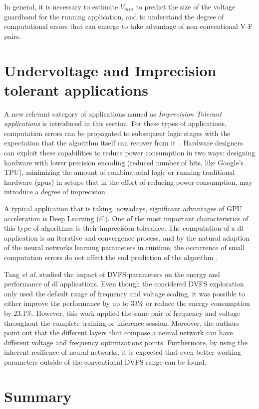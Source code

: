 In general, it is necessary to estimate $V_{min}$ to predict the size of the voltage guardband for the running application, and to understand the degree of computational errors that can emerge to take advantage of non-conventional V-F pairs.

\section{Undervoltage and Imprecision tolerant applications}
\label{sec:under_int_app}
A new relevant category of applications named as \textit{Imprecision Tolerant applications} is introduced in this section. For these types of applications, computation errors can be propagated to subsequent logic stages with the expectation that the algorithm itself can recover from it~\cite{nakhaee_lifetime_2018}. Hardware designers can exploit these capabilities to reduce power consumption in two ways: designing hardware with lower precision encoding (reduced number of bits, like Google's TPU), minimizing the amount of combinatorial logic or running traditional hardware (\acrshort{gpu}s) in setups that in the effort of reducing power consumption, may introduce a degree of imprecision.

A typical application that is taking, nowadays, significant advantages of GPU acceleration is Deep Learning (\acrshort{dl}). One of the most important characteristics of this type of algorithms is their imprecision tolerance. The computation of a \acrshort{dl} application is an iterative and convergence process, and by the natural adaption of the neural networks learning parameters in runtime, the occurrence of small computation errors do not affect the end prediction of the algorithm \cite{jiao_assessment_2017}.

Tang \textit{et al.} \cite{tang_impact_2019} studied the impact of DVFS parameters on the energy and performance of \acrshort{dl} applications. Even though the considered DVFS exploration only used the default range of frequency and voltage scaling, it was possible to either improve the performance by up to 33\% or reduce the energy consumption by 23.1\%. However, this work applied the same pair of frequency and voltage throughout the complete training or inference session. Moreover, the authors point out that the different layers that compose a neural network can have different voltage and frequency optimizations points. Furthermore, by using the inherent resilience of neural networks, it is expected that even better working parameters outside of the conventional DVFS range can be found. 

\section{Summary}